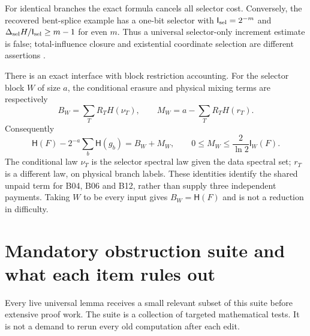 \documentclass[11pt]{article}
\newcommand{\HH}{\mathsf H}\newcommand{\I}{\mathsf I}
\begin{document}
For identical branches the exact formula cancels all selector
cost. Conversely, the recovered bent-splice example has a
one-bit selector with $\I_{\rm sel}=2^{-m}$ and
$\Delta_{\rm sel}H/\I_{\rm sel}\ge m-1$ for even $m$.
Thus a universal selector-only increment estimate is false;
total-influence closure and existential coordinate selection
are different assertions \cite{Reductions}.

There is an exact interface with block restriction accounting.
For the selector block $W$ of size $a$, the conditional erasure
and physical mixing terms are respectively
\[
 B_W=\sum_T R_T H(\nu_T),\qquad
 M_W=a-\sum_T R_T H(r_T).
\]
Consequently
\[
 \HH(F)-2^{-a}\sum_b\HH(g_b)=B_W+M_W,\qquad
 0\le M_W\le\frac2{\ln2}\I_W(F).
\]
The conditional law $\nu_T$ is the selector spectral law given
the data spectral set; $r_T$ is a different law, on physical
branch labels. These identities identify the shared unpaid term
for B04, B06 and B12, rather than supply three independent
payments. Taking $W$ to be every input gives $B_W=\HH(F)$ and is
not a reduction in difficulty.

\section{Mandatory obstruction suite and what each item rules out}

Every live universal lemma receives a small relevant subset of this suite before extensive proof work. The suite is a collection of targeted mathematical tests. It is not a demand to rerun every old computation after each edit.
\end{document}
